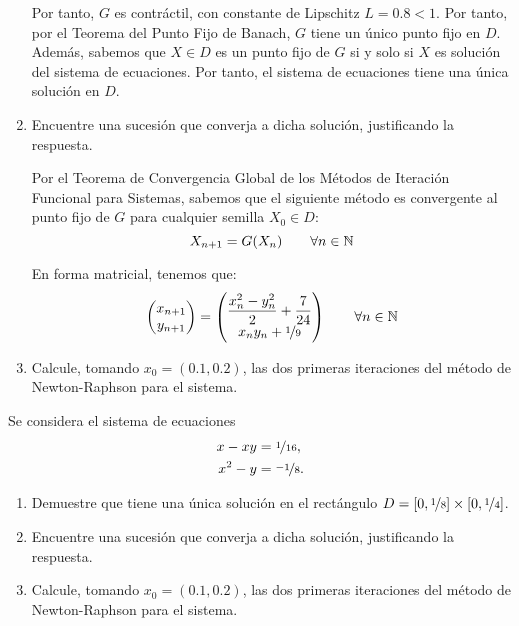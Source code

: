 \begin{ejercicio}
\begin{enumerate}
        Por tanto, $G$ es contráctil, con constante de Lipschitz $L=0.8<1$. Por tanto, por el Teorema del Punto Fijo de Banach, $G$ tiene un único punto fijo en $D$. Además, sabemos que $X\in D$ es un punto fijo de $G$ si y solo si $X$ es solución del sistema de ecuaciones. Por tanto, el sistema de ecuaciones tiene una única solución en $D$.


        \item Encuentre una sucesión que converja a dicha solución, justificando la respuesta.
        
        Por el Teorema de Convergencia Global de los Métodos de Iteración Funcional para Sistemas, sabemos que el siguiente método es convergente al punto fijo de $G$ para cualquier semilla $X_0\in D$:
        \begin{equation*}
            X_{n+1}=G(X_n)\qquad \forall n\in \mathbb{N}
        \end{equation*}

        En forma matricial, tenemos que:
        \begin{equation*}
            \begin{pmatrix}
                x_{n+1}\\
                y_{n+1}
            \end{pmatrix}=\begin{pmatrix}
                \dfrac{x_n^2-y_n^2}{2}+\dfrac{7}{24}\\
                x_ny_n+\nicefrac{1}{9}
            \end{pmatrix}\qquad \forall n\in \mathbb{N}
        \end{equation*}
        \item Calcule, tomando $x_0 = (0.1, 0.2)$, las dos primeras iteraciones del método de Newton-Raphson para el sistema.
        
    \end{enumerate}
\end{ejercicio}


\begin{ejercicio}\label{ej:1.1.18}
    Se considera el sistema de ecuaciones
    \begin{align*}
        x - xy &= \nicefrac{1}{16}, \\
        x^2 - y &= \nicefrac{-1}{8}.
    \end{align*}
    \begin{enumerate}
        \item Demuestre que tiene una única solución en el rectángulo $D = [0, \nicefrac{1}{8}] \times [0, \nicefrac{1}{4}]$.
        \item Encuentre una sucesión que converja a dicha solución, justificando la respuesta.
        \item Calcule, tomando $x_0 = (0.1, 0.2)$, las dos primeras iteraciones del método de Newton-Raphson para el sistema.
    \end{enumerate}
\end{ejercicio}